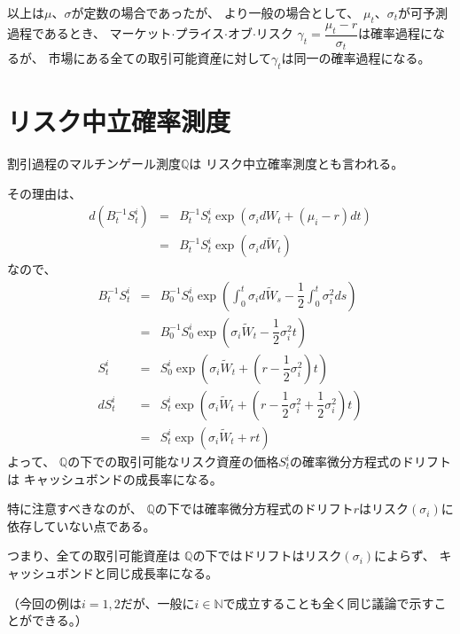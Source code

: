 \documentclass[uplatex,a4j,12pt,dvipdfmx]{jsarticle}
\begin{document}
以上は$\mu$、$\sigma$が定数の場合であったが、
より一般の場合として、
$\mu_{t}$、$\sigma_{t}$が可予測過程であるとき、
マーケット$\cdot$プライス$\cdot$オブ$\cdot$リスク
$\gamma_{t}=\dfrac{\mu_{t} -r}{\sigma_{t}}$は確率過程になるが、
市場にある全ての取引可能資産に対して$\gamma_{t}$は同一の確率過程になる。

\section*{リスク中立確率測度}

割引過程のマルチンゲール測度$\mathbb{Q}$は
リスク中立確率測度とも言われる。

その理由は、
%
%
\begin{eqnarray*}
	d ( B^{-1}_{t} S^{i}_{t} )
	&=&
	B^{-1}_{t} S^{i}_{t} \exp \left( \sigma_{i} dW_{t} + \left( \mu_{i} - r \right) dt \right)
	\\ &=&
	B^{-1}_{t} S^{i}_{t} \exp \left( \sigma_{i} d \tilde{W}_{t} \right)
\end{eqnarray*}
%
%
なので、
%
%
\begin{eqnarray*}
	B^{-1}_{t} S^{i}_{t}
	&=&
	B^{-1}_{0} S^{i}_{0} \exp \left(
	\int^{t}_{0} \sigma_{i} d \tilde{W}_{s}
	- \dfrac{1}{2} \int^{t}_{0} \sigma_{i}^{2} ds
	\right)
	\\ &=&
	B^{-1}_{0} S^{i}_{0} \exp \left(
	\sigma_{i} \tilde{W}_{t}
	- \dfrac{1}{2} \sigma_{i}^{2} t
	\right)
	\\
	S^{i}_{t}
	&=&
	S^{i}_{0} \exp \left(
	\sigma_{i} \tilde{W}_{t}
	+ \left( r - \dfrac{1}{2} \sigma_{i}^{2} \right) t
	\right)
	\\
	d S^{i}_{t}
	&=&
	S^{i}_{t} \exp \left(
	\sigma_{i} \tilde{W}_{t}
	+ \left( r - \dfrac{1}{2} \sigma_{i}^{2} + \dfrac{1}{2} \sigma_{i}^{2} \right) t
	\right)
	\\ &=&
	S^{i}_{t} \exp \left(
	\sigma_{i} \tilde{W}_{t}
	+ r t
	\right)
\end{eqnarray*}
%
%
よって、
$\mathbb{Q}$の下での取引可能なリスク資産の価格$S^{i}_{t}$の確率微分方程式のドリフトは
キャッシュボンドの成長率になる。

特に注意すべきなのが、
$\mathbb{Q}$の下では確率微分方程式のドリフト$r$はリスク$(\sigma_{i})$に依存していない点である。

つまり、全ての取引可能資産は
$\mathbb{Q}$の下ではドリフトはリスク$(\sigma_{i})$によらず、
キャッシュボンドと同じ成長率になる。

（今回の例は$i=1,2$だが、一般に$i \in \mathbb{N}$で成立することも全く同じ議論で示すことができる。）
\end{document}
